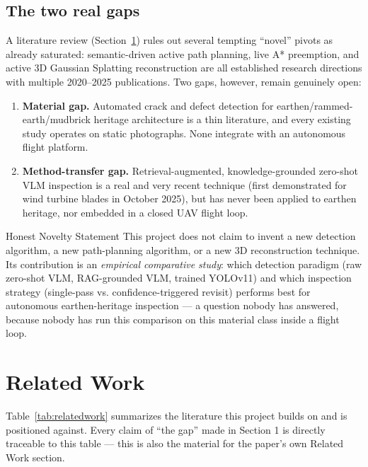 \documentclass[11pt,a4paper]{article}
\begin{document}
\subsection{The two real gaps}

A literature review (Section~\ref{sec:relatedwork}) rules out several tempting ``novel'' pivots as already saturated: semantic-driven active path planning, live A* preemption, and active 3D Gaussian Splatting reconstruction are all established research directions with multiple 2020--2025 publications. Two gaps, however, remain genuinely open:

\begin{enumerate}
    \item \textbf{Material gap.} Automated crack and defect detection for earthen/rammed-earth/mudbrick heritage architecture is a thin literature, and every existing study operates on static photographs. None integrate with an autonomous flight platform.
    \item \textbf{Method-transfer gap.} Retrieval-augmented, knowledge-grounded zero-shot VLM inspection is a real and very recent technique (first demonstrated for wind turbine blades in October 2025), but has never been applied to earthen heritage, nor embedded in a closed UAV flight loop.
\end{enumerate}

\begin{keybox}{Honest Novelty Statement}
This project does not claim to invent a new detection algorithm, a new path-planning algorithm, or a new 3D reconstruction technique. Its contribution is an \emph{empirical comparative study}: which detection paradigm (raw zero-shot VLM, RAG-grounded VLM, trained YOLOv11) and which inspection strategy (single-pass vs. confidence-triggered revisit) performs best for autonomous earthen-heritage inspection --- a question nobody has answered, because nobody has run this comparison on this material class inside a flight loop.
\end{keybox}

\section{Related Work}
\label{sec:relatedwork}

Table~\ref{tab:relatedwork} summarizes the literature this project builds on and is positioned against. Every claim of ``the gap'' made in Section 1 is directly traceable to this table --- this is also the material for the paper's own Related Work section.
\end{document}
